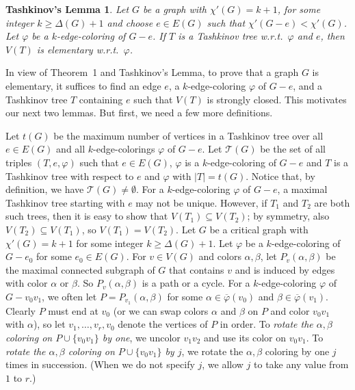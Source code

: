 \documentclass[12pt]{amsart}
\theoremstyle{plain}
\newtheorem*{lemmaA}{Tashkinov's Lemma}
\theoremstyle{definition}
\theoremstyle{remark}
\newcommand{\fancy}[1]{\mathcal{#1}}
\newcommand{\T}{\fancy{T}}
\newcommand{\vph}{\varphi}
\newcommand{\vphn}{\overline{\varphi}}
\begin{document}
\begin{lemmaA}%
Let $G$ be a graph with $\chi'(G)=k+1$, for some integer $k\ge \Delta(G)+1$ and
choose $e\in E(G)$ such that $\chi'(G-e)<\chi'(G)$.  Let $\varphi$ be a
$k$-edge-coloring of $G-e$.  If $T$ is a Tashkinov tree w.r.t.~$\varphi$ and
$e$, then $V(T)$ is elementary w.r.t.~$\varphi$.
\end{lemmaA}

In view of Theorem~1 and Tashkinov's Lemma, to prove that a graph $G$ is elementary,
it suffices to find an edge $e$, a $k$-edge-coloring $\vph$ of $G-e$, and a
Tashkinov tree $T$ containing $e$ such that $V(T)$ is strongly closed.
This motivates our next two lemmas.  But first, we need a few more definitions.

Let $t(G)$ be the maximum number of vertices in a Tashkinov tree over all $e \in E(G)$
and all $k$-edge-colorings $\vph$ of $G - e$.  Let $\T(G)$ be the set of all triples $(T,e,\vph)$ such that $e \in E(G)$, $\vph$ is a $k$-edge-coloring of $G-e$ and
$T$ is a Tashkinov tree with respect to $e$ and $\vph$ with $|T| = t(G)$.  Notice that, by definition, we have $\T(G) \ne \emptyset$.
%
For a $k$-edge-coloring $\vph$ of $G-e$, a maximal Tashkinov tree
starting with $e$ may not be unique.  However, if $T_1$ and $T_2$ are both such
trees, then it is easy to show that $V(T_1)\subseteq V(T_2)$; by symmetry, also
$V(T_2)\subseteq V(T_1)$, so $V(T_1)=V(T_2)$.
%
Let $G$ be a critical graph with $\chi'(G) = k+1$ for some integer $k \ge \Delta(G) + 1$. 
Let $\varphi$ be a $k$-edge-coloring of $G - e_0$ for some $e_0 \in E(G)$.  
For $v \in V(G)$ and colors $\alpha, \beta$, let $P_v(\alpha, \beta)$ be the
maximal connected subgraph of $G$ that contains $v$ and is induced by edges with color
$\alpha$ or $\beta$.  So $P_v(\alpha, \beta)$ is a path or a cycle.
For a $k$-edge-coloring $\vph$ of $G-v_0v_1$, we often let
$P=P_{v_1}(\alpha,\beta)$ for some $\alpha\in\vphn(v_0)$ and
$\beta\in\vphn(v_1)$.  
Clearly $P$ must end at $v_0$ (or we can swap colors $\alpha$ and $\beta$ on
$P$ and color $v_0v_1$ with $\alpha$), so let $v_1,\ldots,v_r,v_0$ denote the
vertices of $P$ in order. 
To \emph{rotate the $\alpha,\beta$ coloring on $P\cup\{v_0v_1\}$ by one}, we
uncolor $v_1v_2$ and use its color on $v_0v_1$.  To \emph{rotate the
$\alpha,\beta$ coloring on $P\cup\{v_0v_1\}$ by $j$}, we rotate the
$\alpha,\beta$ coloring by one $j$ times in succession.
(When we do not specify $j$, we allow $j$ to take any value from $1$ to
$r$.)  
\end{document}
